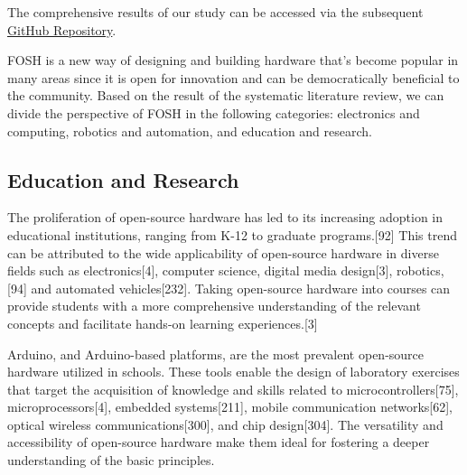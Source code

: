 \documentclass[final-report.tex]{subfiles}
\begin{document}
The comprehensive results of our study can be accessed via the subsequent
\href{https://github.com/aliraeisdanaei/FOSH_Lit_Review}{GitHub Repository}.

FOSH is a new way of designing and building hardware that's become popular in many areas since it is open for innovation and can be democratically beneficial to the community. 
Based on the result of the systematic literature review, we can divide the perspective of FOSH in the following categories: electronics and computing, robotics and automation, and education and research.

\subsection{Education and Research}





The proliferation of open-source hardware has led to its increasing adoption in educational institutions, ranging from K-12 to graduate programs.[92] 
This trend can be attributed to the wide applicability of open-source hardware in diverse fields such as electronics[4], computer science, digital media design[3], robotics,[94] and automated vehicles[232]. 
Taking open-source hardware into courses can provide students with a more comprehensive understanding of the relevant concepts and facilitate hands-on learning experiences.[3]

Arduino, and Arduino-based platforms, are the most prevalent open-source hardware utilized in schools. 
These tools enable the design of laboratory exercises that target the acquisition of knowledge and skills related to microcontrollers[75], microprocessors[4], embedded systems[211], mobile communication networks[62], optical wireless communications[300], and chip design[304]. 
The versatility and accessibility of open-source hardware make them ideal for fostering a deeper understanding of the basic principles.
\end{document}
